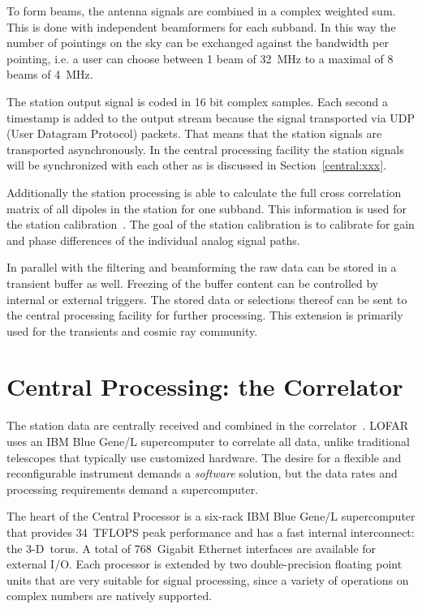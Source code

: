 \documentclass[journal]{IEEEtran}
\begin{document}
To form beams, the antenna signals are combined in a complex weighted sum. This is done with independent beamformers for each subband. In this way the number of pointings on the sky can be exchanged against the bandwidth per pointing, i.e. a user can choose between 1 beam of 32~MHz to a maximal of 8 beams of 4~MHz. 

The station output signal is coded in 16 bit complex samples. Each second a timestamp is added to the output stream because the signal transported via UDP (User Datagram Protocol) packets. That means that the station signals are transported asynchronously. In the central processing facility the station signals will be synchronized with each other as is discussed in Section~\ref{central:xxx}.

Additionally the station processing is able to calculate the full cross correlation matrix of all dipoles in the station for one subband. This information is used for the station calibration~\cite{stefan:xxx}. The goal of the station calibration is to calibrate for gain and phase differences of the individual analog signal paths. 

In parallel with the filtering and beamforming the raw data can be stored in a transient buffer as well. Freezing of the buffer content can be controlled by internal or external triggers. The stored data or selections thereof can be sent to the central processing facility for further processing. This extension is primarily used for the transients and cosmic ray community.


\section{Central Processing: the Correlator}

The station data are centrally received and combined in the
correlator~\cite{Romein:06}.
LOFAR uses an IBM Blue Gene/L supercomputer to correlate all data,
unlike traditional telescopes that typically use customized hardware.
The desire for a flexible and reconfigurable instrument demands a
{\em software\/} solution, but the data rates and processing requirements
demand a supercomputer.

The heart of the Central Processor is a six-rack IBM Blue Gene/L supercomputer
that provides 34~TFLOPS peak performance and has a fast internal interconnect:
the 3-D~torus.
A total of 768~Gigabit Ethernet interfaces are available for external I/O.
Each processor is extended by two double-precision floating point units
that are very suitable for signal processing, since a variety of operations
on complex numbers are natively supported.
\end{document}
